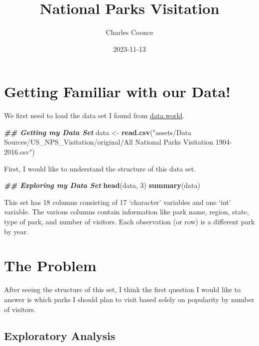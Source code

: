 \documentclass[
]{article}
\title{National Parks Visitation}
\author{Charles Coonce}
\date{2023-11-13}
\newenvironment{Shaded}{\begin{snugshade}}{\end{snugshade}}
\newcommand{\DecValTok}[1]{\textcolor[rgb]{0.00,0.00,0.81}{#1}}
\newcommand{\DocumentationTok}[1]{\textcolor[rgb]{0.56,0.35,0.01}{\textbf{\textit{#1}}}}
\newcommand{\FunctionTok}[1]{\textcolor[rgb]{0.13,0.29,0.53}{\textbf{#1}}}
\newcommand{\NormalTok}[1]{#1}
\newcommand{\OtherTok}[1]{\textcolor[rgb]{0.56,0.35,0.01}{#1}}
\newcommand{\StringTok}[1]{\textcolor[rgb]{0.31,0.60,0.02}{#1}}
\begin{document}
\maketitle

\label{data_exploration}
\section{Getting Familiar with our
Data!}\label{getting-familiar-with-our-data}

We first need to load the data set I found from
\href{https://data.world/inform8n/us-national-parks-visitation-1904-2016-with-boundaries/workspace/file?filename=All+National+Parks+Visitation+1904-2016.csv}{data.world}.

\begin{Shaded}
\begin{Highlighting}[]
  \DocumentationTok{\#\# Getting my Data Set}
\NormalTok{data }\OtherTok{\textless{}{-}} \FunctionTok{read.csv}\NormalTok{(}\StringTok{"assets/Data Sources/US\_NPS\_Visitation/original/All National Parks Visitation 1904{-}2016.csv"}\NormalTok{)}
\end{Highlighting}
\end{Shaded}

First, I would like to understand the structure of this data set.

\begin{Shaded}
\begin{Highlighting}[]
  \DocumentationTok{\#\# Exploring my Data Set}
\FunctionTok{head}\NormalTok{(data, }\DecValTok{3}\NormalTok{)}
\FunctionTok{summary}\NormalTok{(data)}
\end{Highlighting}
\end{Shaded}

This set has 18 columns consisting of 17 `character' variables and one
`int' variable. The various columns contain information like park name,
region, state, type of park, and number of visitors. Each observation
(or row) is a different park by year.

\section{The Problem}\label{the-problem}

After seeing the structure of this set, I think the first question I
would like to answer is which parks I should plan to visit based solely
on popularity by number of visitors.

\subsection{Exploratory Analysis}\label{exploratory-analysis}
\end{document}
